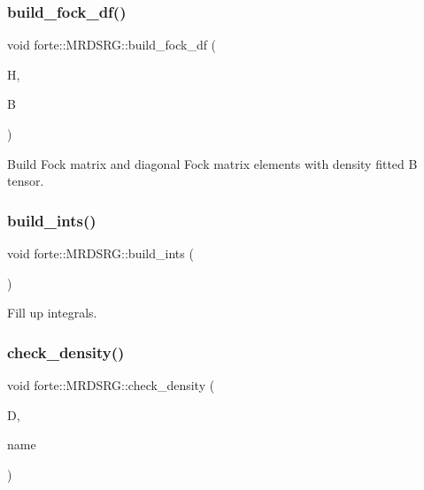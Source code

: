 \subsubsection{\texorpdfstring{build\+\_\+fock\+\_\+df()}{build\_fock\_df()}}
{\footnotesize\ttfamily void forte\+::\+M\+R\+D\+S\+R\+G\+::build\+\_\+fock\+\_\+df (\begin{DoxyParamCaption}\item[{Blocked\+Tensor \&}]{H,  }\item[{Blocked\+Tensor \&}]{B }\end{DoxyParamCaption})\hspace{0.3cm}{\ttfamily [protected]}}



Build Fock matrix and diagonal Fock matrix elements with density fitted B tensor. 

\mbox{\label{classforte_1_1_m_r_d_s_r_g_a9fb69b7eb9efca77194ace4e1d75d214}} 
\subsubsection{\texorpdfstring{build\+\_\+ints()}{build\_ints()}}
{\footnotesize\ttfamily void forte\+::\+M\+R\+D\+S\+R\+G\+::build\+\_\+ints (\begin{DoxyParamCaption}{ }\end{DoxyParamCaption})\hspace{0.3cm}{\ttfamily [protected]}}



Fill up integrals. 

\mbox{\label{classforte_1_1_m_r_d_s_r_g_aae5f86dbb476bb014b57d57a1a74db6e}} 
\subsubsection{\texorpdfstring{check\+\_\+density()}{check\_density()}}
{\footnotesize\ttfamily void forte\+::\+M\+R\+D\+S\+R\+G\+::check\+\_\+density (\begin{DoxyParamCaption}\item[{Blocked\+Tensor \&}]{D,  }\item[{const std\+::string \&}]{name }\end{DoxyParamCaption})\hspace{0.3cm}{\ttfamily [protected]}}



